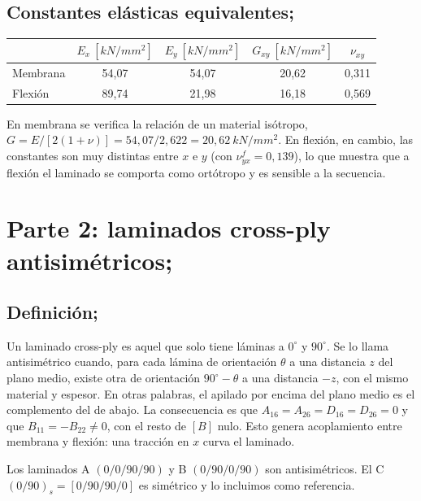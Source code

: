 \documentclass[11pt,a4paper]{article}
\newcommand{\Eeq}{\si{kN/mm^2}}
\begin{document}
\subsection{Constantes elásticas equivalentes;}
\begin{center}
\begin{tabular}{lcccc}
\toprule
 & $E_x\ [\Eeq]$ & $E_y\ [\Eeq]$ & $G_{xy}\ [\Eeq]$ & $\nu_{xy}$ \\
\midrule
Membrana & 54,07 & 54,07 & 20,62 & 0,311 \\
Flexión  & 89,74 & 21,98 & 16,18 & 0,569 \\
\bottomrule
\end{tabular}
\end{center}
En membrana se verifica la relación de un material isótropo, $G=E/[2(1+\nu)]=54{,}07/2{,}622=20{,}62\ \Eeq$. En flexión, en cambio, las constantes son muy distintas entre $x$ e $y$ (con $\nu^f_{yx}=0{,}139$), lo que muestra que a flexión el laminado se comporta como ortótropo y es sensible a la secuencia.

\section{Parte 2: laminados cross-ply antisimétricos;}

\subsection{Definición;}
Un laminado cross-ply es aquel que solo tiene láminas a $0^\circ$ y $90^\circ$. Se lo llama antisimétrico cuando, para cada lámina de orientación $\theta$ a una distancia $z$ del plano medio, existe otra de orientación $90^\circ-\theta$ a una distancia $-z$, con el mismo material y espesor. En otras palabras, el apilado por encima del plano medio es el complemento del de abajo. La consecuencia es que $A_{16}=A_{26}=D_{16}=D_{26}=0$ y que $B_{11}=-B_{22}\neq0$, con el resto de $[B]$ nulo. Esto genera acoplamiento entre membrana y flexión: una tracción en $x$ curva el laminado.

Los laminados A $(0/0/90/90)$ y B $(0/90/0/90)$ son antisimétricos. El C $(0/90)_s=[0/90/90/0]$ es simétrico y lo incluimos como referencia.
\end{document}
